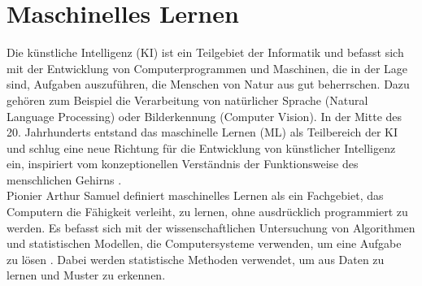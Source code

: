 \documentclass[german,bachelor]{swsLeipzig}
\begin{document}
\section{Maschinelles Lernen}
Die künstliche Intelligenz (KI) ist ein Teilgebiet der Informatik und befasst sich mit der Entwicklung von Computerprogrammen und Maschinen,
die in der Lage sind, Aufgaben auszuführen, die Menschen von Natur aus gut beherrschen.
Dazu gehören zum Beispiel die Verarbeitung von natürlicher Sprache (Natural Language Processing) oder Bilderkennung (Computer Vision).
In der Mitte des 20. Jahrhunderts entstand das maschinelle Lernen (ML) als Teilbereich der KI und schlug eine neue Richtung
für die Entwicklung von künstlicher Intelligenz ein, inspiriert vom konzeptionellen Verständnis der Funktionsweise des menschlichen Gehirns \cite[]{2020}.\\

Pionier Arthur Samuel definiert maschinelles Lernen als ein Fachgebiet, das Computern die Fähigkeit verleiht, zu lernen,
ohne ausdrücklich programmiert zu werden.
Es befasst sich mit der wissenschaftlichen Untersuchung von Algorithmen und statistischen Modellen,
die Computersysteme verwenden, um eine Aufgabe zu lösen \cite[]{mahesh2020machine}.
Dabei werden statistische Methoden verwendet, um aus Daten zu lernen und Muster zu erkennen. \\





\end{document}
